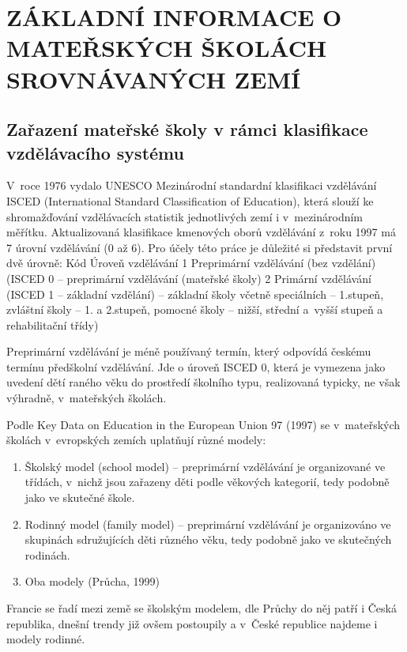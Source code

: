 	
\chapter{ZÁKLADNÍ INFORMACE O MATEŘSKÝCH ŠKOLÁCH SROVNÁVANÝCH ZEMÍ}

	\section{Zařazení mateřské školy v rámci klasifikace vzdělávacího systému}

		V roce 1976 vydalo UNESCO Mezinárodní standardní klasifikaci vzdělávání ISCED (International Standard Classification of Education), která slouží ke shromažďování vzdělávacích statistik jednotlivých zemí i v mezinárodním měřítku. Aktualizovaná klasifikace kmenových oborů vzdělávání z roku 1997 má 7 úrovní vzdělávání (0 až 6).
		Pro účely této práce je důležité si představit první dvě úrovně:
		Kód Úroveň vzdělávání
		1   Preprimární vzdělávání (bez vzdělání) (ISCED 0 – preprimární vzdělávání (mateřské školy)
		2  Primární vzdělávání (ISCED 1 – základní vzdělání) – základní školy včetně speciálních – 1.stupeň, zvláštní školy – 1. a 2.stupeň, pomocné školy – nižší, střední a vyšší stupeň a rehabilitační třídy)

		Preprimární vzdělávání je méně používaný termín, který odpovídá českému termínu předškolní vzdělávání. Jde o úroveň ISCED 0, která je vymezena jako uvedení dětí raného věku do prostředí školního typu, realizovaná typicky, ne však výhradně, v mateřských školách.

		Podle Key Data on Education in the European Union 97 (1997) se v mateřských školách v evropských zemích uplatňují různé modely:
		\begin{enumerate}[1)]
		\item Školský model (school model) – preprimární vzdělávání je organizované ve třídách, v nichž jsou zařazeny děti podle věkových kategorií, tedy podobně jako ve skutečné škole. 
		\item Rodinný model (family model) – preprimární vzdělávání je organizováno ve skupinách sdružujících děti různého věku, tedy podobně jako ve skutečných rodinách. 
		\item Oba modely
		(Průcha, 1999)
		\end{enumerate}

		Francie se řadí mezi země se školským modelem, dle Průchy do něj patří i Česká republika, dnešní trendy již ovšem postoupily a v České republice najdeme i modely rodinné.

